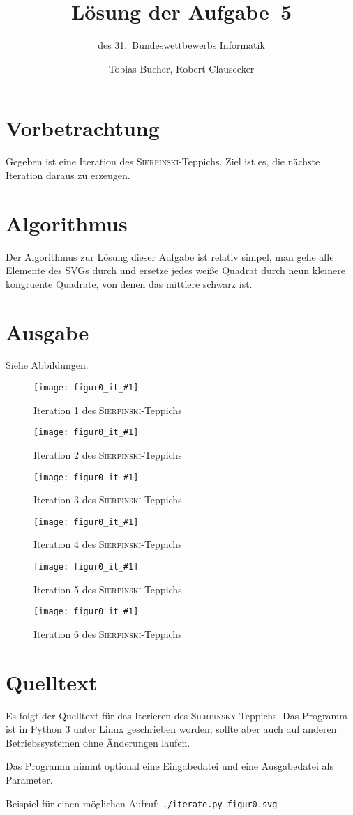 \documentclass{scrartcl}
\title{Lösung der Aufgabe~5}
\subtitle{des 31.~Bundeswettbewerbs Informatik}
\author{Tobias Bucher, Robert Clausecker}
\newcommand{\src}[1]{\texttt{#1}}
\begin{document}
\maketitle

\section{Vorbetrachtung}
Gegeben ist eine Iteration des \textsc{Sierpinski}-Teppichs. Ziel ist es, die
nächste Iteration daraus zu erzeugen.

\section{Algorithmus}
Der Algorithmus zur Lösung dieser Aufgabe ist relativ simpel, man gehe alle
Elemente des SVGs durch und ersetze jedes weiße Quadrat durch neun kleinere
kongruente Quadrate, von denen das mittlere schwarz ist.

\section{Ausgabe}
Siehe Abbildungen.

\newcommand{\SierpinskyIteration}[1]{%
\begin{figure} %
	\center\texttt{[image: figur0\_it\_\#1]} %
	\caption{Iteration #1 des \textsc{Sierpinski}-Teppichs} %
\end{figure}
}

\SierpinskyIteration{1}
\SierpinskyIteration{2}
\SierpinskyIteration{3}
\SierpinskyIteration{4}
\SierpinskyIteration{5}
\SierpinskyIteration{6}

\newpage\appendix
\section{Quelltext}
Es folgt der Quelltext für das Iterieren des \textsc{Sierpinsky}-Teppichs. Das
Programm ist in Python 3 unter Linux geschrieben worden, sollte aber auch auf
anderen Betriebssystemen ohne Änderungen laufen.

Das Programm nimmt optional eine Eingabedatei und eine Ausgabedatei als
Parameter.

Beispiel für einen möglichen Aufruf: \src{./iterate.py figur0.svg}
\end{document}
